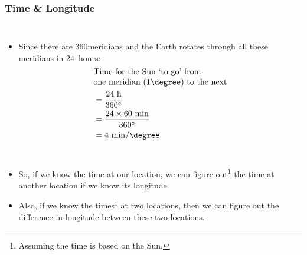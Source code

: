 \begin{frame}
\frametitle{Time \& Longitude}
\def\fn{\tiny Assuming the time is based on the Sun.}
\begin{columns}[t]
	\begin{itemize}
		\item Since there are 360\degree meridians and the Earth rotates through all these meridians in 24~hours:
		{
			\color{black!90}
			\small\begin{align*}
			&\text{\shortstack[l]{Time for the Sun `to go' from\\ one meridian (1\degree) to the next}} \\
			&= \frac{24\text{ h}}{360 ^\circ} \\
			&= \frac{24\times 60 \text{ min}}{360^\circ} \\
			&= 4\text{ min/\degree}
			\end{align*}
		}
	\end{itemize}
\end{columns}

\begin{itemize}
	\item So, if we know the time at our location, we can figure out\footnote{\fn} the time at another location if we know its longitude.
	\item Also, if we know the times$^\text{1}$ at two locations, then we can figure out the difference in longitude between these two locations.
\end{itemize}
\end{frame}

